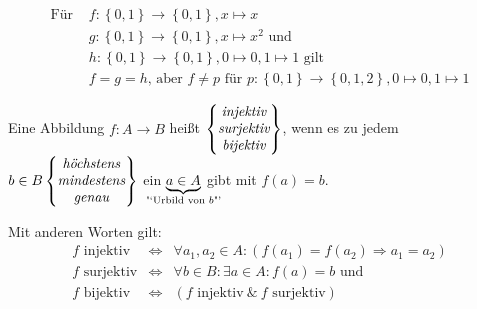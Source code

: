 \documentclass[../../main.tex]{subfiles}
\begin{document}
\begin{bsp}\label{1.1.18}
\begin{align*}
\text{Für }& f\colon\left\{0,1\right\}\rightarrow\left\{0,1\right\}, x\mapsto x\\
& g:\left\{0,1\right\}\rightarrow\left\{0,1\right\}, x\mapsto x^2\text{ und}\\
& h:\left\{0,1\right\}\rightarrow\left\{0,1\right\}, 0\mapsto 0, 1\mapsto 1 \text{ gilt}\\
& f=g=h\text{, aber }f\neq p\text{ für }p:\left\{0,1\right\}\rightarrow\left\{0,1,2\right\}, 0\mapsto0, 1\mapsto 1
\end{align*}
\end{bsp}

\begin{df}\label{1.1.19}
Eine Abbildung $f\colon A\rightarrow B$ heißt $\begin{Bmatrix}\emph{injektiv}\\\emph{surjektiv}\\\emph{bijektiv}\end{Bmatrix}$, wenn es zu jedem $b\in B \begin{Bmatrix}\emph{höchstens}\\\emph{mindestens}\\\emph{genau}\end{Bmatrix}$ ein $\underbrace{a\in A}_{\mathclap{\text{"`Urbild von $b$"'}}}$ gibt mit $f(a)=b$.

Mit anderen Worten gilt:
\begin{eqnarray*}
f \text{ injektiv}&\iff& \forall a_1,a_2 \in A:(f(a_1)=f(a_2)\Longrightarrow a_1=a_2)\\
f \text{ surjektiv}&\iff& \forall b\in B: \exists a\in A:f(a)=b\text{ und}\\
f \text{ bijektiv} &\iff& (f\text{ injektiv} ~\&~ f\text{ surjektiv})
\end{eqnarray*}
\end{df}
\end{document}
